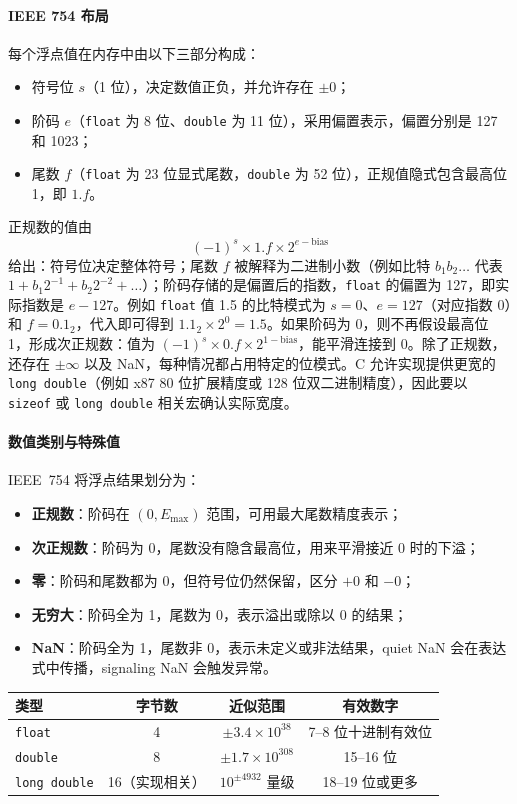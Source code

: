 \paragraph{IEEE 754 布局}
每个浮点值在内存中由以下三部分构成：
\begin{itemize}
  \item 符号位 $s$（1 位），决定数值正负，并允许存在 $\pm 0$；
  \item 阶码 $e$（\texttt{float} 为 8 位、\texttt{double} 为 11 位），采用偏置表示，偏置分别是 127 和 1023；
  \item 尾数 $f$（\texttt{float} 为 23 位显式尾数，\texttt{double} 为 52 位），正规值隐式包含最高位 1，即 $1.f$。
\end{itemize}
正规数的值由
\[
(-1)^s \times 1.f \times 2^{e-\text{bias}}
\]
给出：符号位决定整体符号；尾数 $f$ 被解释为二进制小数（例如比特 $b_1b_2\ldots$ 代表 $1 + b_1 2^{-1} + b_2 2^{-2} + \ldots$）；阶码存储的是偏置后的指数，\texttt{float} 的偏置为 127，即实际指数是 $e - 127$。例如 \texttt{float} 值 1.5 的比特模式为 $s=0$、$e=127$（对应指数 0）和 $f=0.1_2$，代入即可得到 $1.1_2 \times 2^0 = 1.5$。如果阶码为 0，则不再假设最高位 1，形成次正规数：值为 $(-1)^s \times 0.f \times 2^{1-\text{bias}}$，能平滑连接到 0。除了正规数，还存在 $\pm\infty$ 以及 NaN，每种情况都占用特定的位模式。C 允许实现提供更宽的 \texttt{long double}（例如 x87 80 位扩展精度或 128 位双二进制精度），因此要以 \texttt{sizeof} 或 \texttt{long double} 相关宏确认实际宽度。

\paragraph{数值类别与特殊值}
IEEE~754 将浮点结果划分为：
\begin{itemize}
  \item \textbf{正规数}：阶码在 $(0, E_{\max})$ 范围，可用最大尾数精度表示；
  \item \textbf{次正规数}：阶码为 0，尾数没有隐含最高位，用来平滑接近 0 时的下溢；
  \item \textbf{零}：阶码和尾数都为 0，但符号位仍然保留，区分 $+0$ 和 $-0$；
  \item \textbf{无穷大}：阶码全为 1，尾数为 0，表示溢出或除以 0 的结果；
  \item \textbf{NaN}：阶码全为 1，尾数非 0，表示未定义或非法结果，quiet NaN 会在表达式中传播，signaling NaN 会触发异常。
\end{itemize}

\begin{center}
  \begin{tabular}{lccc}
    \toprule
    类型 & 字节数 & 近似范围 & 有效数字 \\
    \midrule
    \texttt{float} & 4 & $\pm 3.4 \times 10^{38}$ & 7--8 位十进制有效位 \\
    \texttt{double} & 8 & $\pm 1.7 \times 10^{308}$ & 15--16 位 \\
    \texttt{long double} & 16（实现相关） & $10^{\pm 4932}$ 量级 & 18--19 位或更多 \\
    \bottomrule
  \end{tabular}
\end{center}

